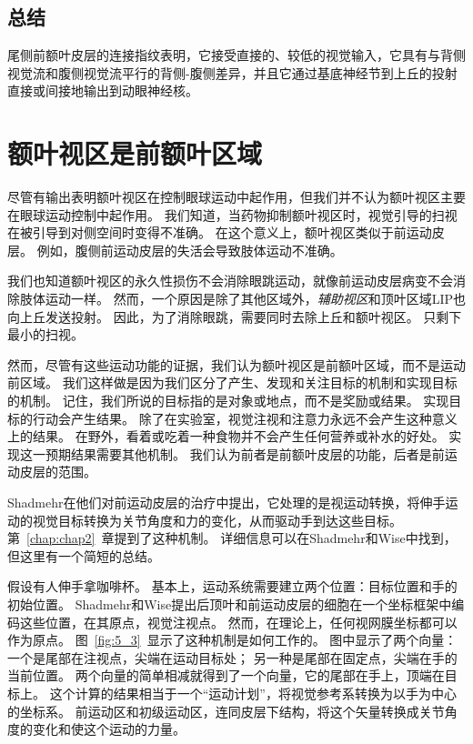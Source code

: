\subsection{总结}

尾侧前额叶皮层的连接指纹表明，它接受直接的、较低的视觉输入，它具有与背侧视觉流和腹侧视觉流平行的背侧-腹侧差异，并且它通过基底神经节到上丘的投射直接或间接地输出到动眼神经核。



\section{额叶视区是前额叶区域}

尽管有输出表明额叶视区在控制眼球运动中起作用，但我们并不认为额叶视区主要在眼球运动控制中起作用。
我们知道，当药物抑制额叶视区时，视觉引导的扫视在被引导到对侧空间时变得不准确\cite{sommer1997reversible}。
在这个意义上，额叶视区类似于前运动皮层。
例如，腹侧前运动皮层的失活会导致肢体运动不准确\cite{kurata1994differential}。


我们也知道额叶视区的永久性损伤不会消除眼跳运动，就像前运动皮层病变不会消除肢体运动一样。
然而，一个原因是除了其他区域外，\textit{辅助视区}\cite{huerta1990supplementary}和顶叶区域LIP\cite{holloway2002brief}也向上丘发送投射。
因此，为了消除眼跳，需要同时去除上丘和额叶视区\cite{schiller1979effects,schiller1987effect}。
只剩下最小的扫视。


然而，尽管有这些运动功能的证据，我们认为额叶视区是前额叶区域，而不是运动前区域。
我们这样做是因为我们区分了产生、发现和关注目标的机制和实现目标的机制。
记住，我们所说的目标指的是对象或地点，而不是奖励或结果。
实现目标的行动会产生结果。
除了在实验室，视觉注视和注意力永远不会产生这种意义上的结果。
在野外，看着或吃着一种食物并不会产生任何营养或补水的好处。
实现这一预期结果需要其他机制。
我们认为前者是前额叶皮层的功能，后者是前运动皮层的范围。


Shadmehr\cite{shadmehr2004computational}在他们对前运动皮层的治疗中提出，它处理的是视运动转换，将伸手运动的视觉目标转换为关节角度和力的变化，从而驱动手到达这些目标。
第~\ref{chap:chap2}~章提到了这种机制。
详细信息可以在Shadmehr和Wise中找到，但这里有一个简短的总结。


假设有人伸手拿咖啡杯。
基本上，运动系统需要建立两个位置：目标位置和手的初始位置。
Shadmehr和Wise提出后顶叶和前运动皮层的细胞在一个坐标框架中编码这些位置，在其原点，视觉注视点。
然而，在理论上，任何视网膜坐标都可以作为原点。
图~\ref{fig:5_3}~显示了这种机制是如何工作的。
图中显示了两个向量：一个是尾部在注视点，尖端在运动目标处；
另一种是尾部在固定点，尖端在手的当前位置。
两个向量的简单相减就得到了一个向量，它的尾部在手上，顶端在目标上。
这个计算的结果相当于一个“运动计划”，将视觉参考系转换为以手为中心的坐标系。
前运动区和初级运动区，连同皮层下结构，将这个矢量转换成关节角度的变化和使这个运动的力量。


